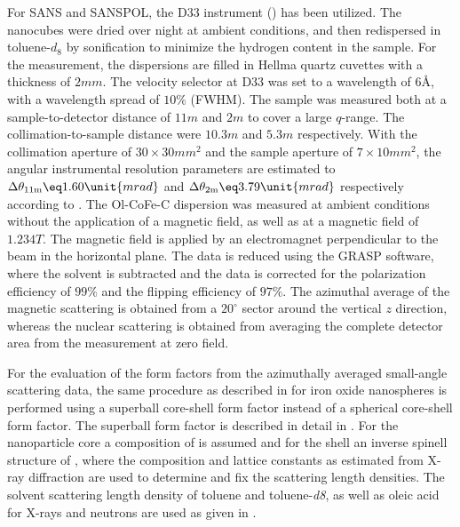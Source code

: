 \documentclass[\main/dresen_thesis.tex]{subfiles}
\begin{document}
    For SANS and SANSPOL, the D33 instrument () has been utilized.
    The nanocubes were dried over night at ambient conditions, and then redispersed in toluene-$\mathit{d_8}$ by sonification to minimize the hydrogen content in the sample.
    For the measurement, the dispersions are filled in Hellma quartz cuvettes with a thickness of $2 \unit{mm}$.
    The velocity selector at D33 was set to a wavelength of $6 \unit{\angstrom}$, with a wavelength spread of $10 \%$ (FWHM).
    The sample was measured both at a sample-to-detector distance of $11 \unit{m}$ and $2 \unit{m}$ to cover a large $q$-range.
    The collimation-to-sample distance were $10.3 \unit{m}$ and $5.3 \unit{m}$ respectively.
    With the collimation aperture of $30 \times 30 \unit{mm^2}$ and the sample aperture of $7 \times 10 \unit{mm^2}$, the angular instrumental resolution parameters are estimated to $\Delta \theta_\mathrm{11 m} \eq 1.60 \unit{mrad}$ and     $\Delta \theta_\mathrm{2 m} \eq 3.79 \unit{mrad}$ respectively according to .
    The Ol-CoFe-C dispersion was measured at ambient conditions without the application of a magnetic field, as well as at a magnetic field of $1.234 \unit{T}$. %
    The magnetic field is applied by an electromagnet perpendicular to the beam in the horizontal plane.
    The data is reduced using the GRASP software, where the solvent is subtracted and the data is corrected for the polarization efficiency of $99 \%$ and the flipping efficiency of $97 \%$.
    The azimuthal average of the magnetic scattering is obtained from a $20 ^\circ$ sector around the vertical $z$ direction, whereas the nuclear scattering is obtained from averaging the complete detector area from the measurement at zero field.

    For the evaluation of the form factors from the azimuthally averaged small-angle scattering data, the same procedure as described in  for iron oxide nanospheres is performed using a superball core-shell form factor instead of a spherical core-shell form factor.
    The superball form factor is described in detail in .
    For the nanoparticle core a composition of  is assumed and for the shell an inverse spinell structure of , where the composition and lattice constants as estimated from X-ray diffraction are used to determine and fix the scattering length densities.
    The solvent scattering length density of toluene and toluene-\textit{d8}, as well as oleic acid for X-rays and neutrons are used as given in .
\end{document}
